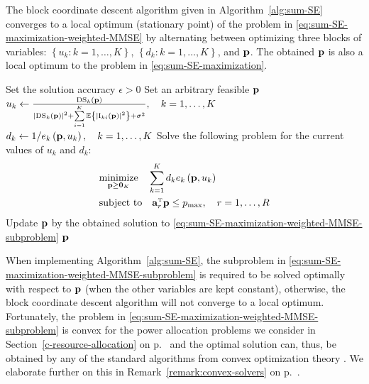 \begin{lemma}  \label{theorem:weighted-MMSE-convergence} The block coordinate descent algorithm given in Algorithm~\ref{alg:sum-SE} converges to a local optimum (stationary point) of the problem in \eqref{eq:sum-SE-maximization-weighted-MMSE} by alternating between optimizing three blocks of variables: $\left\{u_{k}:k=1,\ldots,K\right\}$, $\left\{d_{k}:k=1,\ldots,K\right\}$, and $\mathbf{p}$. The obtained $\mathbf{p}$ is also a local optimum to the problem in \eqref{eq:sum-SE-maximization}.
	\end{lemma}


\begin{algorithm}
	\caption{Block coordinate descent algorithm for solving the sum SE maximization problem in \eqref{eq:sum-SE-maximization-weighted-MMSE}.} \label{alg:sum-SE}
	\begin{algorithmic}[1]
		 Set the solution accuracy $\epsilon>0$
		\State Set an arbitrary feasible $\mathbf{p}$
		\State $u_{k} \gets \frac{\textrm{DS}_{k}\left(\mathbf{p}\right)}{\left|\textrm{DS}_{k}\left(\mathbf{p}\right)\right|^2+\sum\limits_{i=1}^K\mathbb{E}\left\{\left|\textrm{I}_{ki}\left(\mathbf{p}\right)\right|^2\right\}+\sigma^2}, \quad k=1,\ldots,K$
		\State $d_k \gets 1/e_k\left(\mathbf{p},u_k\right), \quad k=1,\ldots,K$
		\State Solve the following problem for the current values of  $u_k$ and $d_k$:
		\begin{align}
		&\underset{\vect{p} \geq \vect{0}_K}{\textrm{minimize}} \quad \sum_{k=1}^Kd_{k}e_{k}\left(\vect{p},u_k\right) \label{eq:sum-SE-maximization-weighted-MMSE-subproblem} \\
		&\hspace{0cm}\textrm{subject to} \quad \vect{a}_r^{\Ttran}\vect{p}\leq p_{\textrm{max}}, \quad r=1,\ldots,R  \nonumber
		\end{align}
		\State Update $\mathbf{p}$ by the obtained solution to \eqref{eq:sum-SE-maximization-weighted-MMSE-subproblem}
		\EndWhile
		 $\mathbf{p}$
	\end{algorithmic}
\end{algorithm}

When implementing Algorithm~\ref{alg:sum-SE}, the subproblem in \eqref{eq:sum-SE-maximization-weighted-MMSE-subproblem} is required to be solved optimally with respect to $\mathbf{p}$ (when the other variables are kept constant), otherwise, the block coordinate descent algorithm will not converge to a local optimum. Fortunately, the problem in \eqref{eq:sum-SE-maximization-weighted-MMSE-subproblem} is convex for the power allocation problems we consider in Section~\ref{c-resource-allocation} on p.~\pageref{c-resource-allocation} and the optimal solution can, thus, be obtained by any of the standard algorithms from convex optimization theory \cite{Boyd2004a}.
We elaborate further on this in Remark~\ref{remark:convex-solvers} on p.~\pageref{remark:convex-solvers}.


